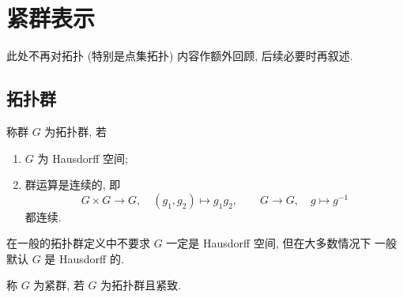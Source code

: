 \section{紧群表示}

此处不再对拓扑 (特别是点集拓扑) 内容作额外回顾, 后续必要时再叙述.

\subsection{拓扑群}

\begin{definition}[拓扑群]\label{def:topological-group}
称群 $G$ 为拓扑群, 若
\begin{enumerate}
  \item $G$ 为 Hausdorff 空间;
  \item 群运算是连续的, 即
  \[
    G\times G\longrightarrow G,\quad (g_1,g_2)\longmapsto g_1g_2,
    \qquad
    G\longrightarrow G,\quad g\longmapsto g^{-1}
  \]
  都连续.
\end{enumerate}
\end{definition}

\begin{remark}\label{rem:hausdorff-topological-group}
在一般的拓扑群定义中不要求 $G$ 一定是 Hausdorff 空间, 但在大多数情况下
一般默认 $G$ 是 Hausdorff 的.
\end{remark}

\begin{definition}[紧群]\label{def:compact-group}
称 $G$ 为紧群, 若 $G$ 为拓扑群且紧致.
\end{definition}

